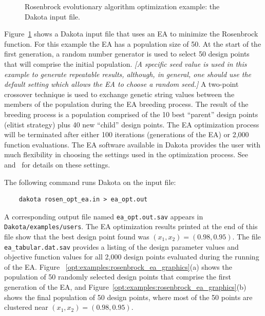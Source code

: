 \begin{figure}[ht!]
  \centering
  \begin{bigbox}
    \begin{small}
    \end{small}
  \end{bigbox}
  \caption{Rosenbrock evolutionary algorithm optimization example: the
  Dakota input file.}
  \label{opt:examples:rosenbrock_ea}
\end{figure}

Figure~\ref{opt:examples:rosenbrock_ea} shows a Dakota input file that
uses an EA to minimize the Rosenbrock function. For this
example the EA has a population size of 50. At the start of the first
generation, a random number generator is used to select 50 design
points that will comprise the initial population. \emph{[A specific
  seed value is used in this example to generate repeatable results,
  although, in general, one should use the default setting which
  allows the EA to choose a random seed.]} A two-point crossover
technique is used to exchange genetic string values between the
members of the population during the EA breeding process. The result
of the breeding process is a population comprised of the 10 best
``parent'' design points (elitist strategy) plus 40 new ``child''
design points. The EA optimization process will be terminated after
either 100 iterations (generations of the EA) or 2,000 function
evaluations. The EA software available in Dakota provides the user
with much flexibility in choosing the settings used in the
optimization process. See~\cite{RefMan} and~\cite{Har06} for details on these
settings.

The following command runs Dakota on the input file:
\begin{small}
\begin{verbatim}
    dakota rosen_opt_ea.in > ea_opt.out
\end{verbatim}
\end{small}

A corresponding output file named \texttt{ea\_opt.out.sav} appears in
\texttt{Dakota/examples/users}. The EA optimization results
printed at the end of this file show that the best design point found
was $(x_1,x_2) = (0.98,0.95)$. The file
\texttt{ea\_tabular.dat.sav} provides a listing of the design
parameter values and objective function values for all 2,000 design
points evaluated during the running of the EA. Figure~
\ref{opt:examples:rosenbrock_ea_graphics}(a) shows the population of
50 randomly selected design points that comprise the first generation
of the EA, and Figure~\ref{opt:examples:rosenbrock_ea_graphics}(b)
shows the final population of 50 design points, where most of the 50
points are clustered near $(x_1,x_2) = (0.98,0.95)$.

